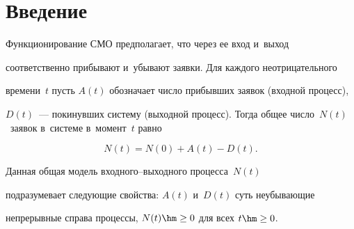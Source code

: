 

      












 \thispagestyle{headings}


 


 \vspace*{-12pt}





\section{Введение}





\vspace*{-4pt}














     Функционирование СМО предполагает, что через ее вход и~выход 


соответственно прибывают и~убывают заявки. Для каждого неотрицательного 


времени~$t$ пусть $A(t)$ обозначает чис\-ло прибывших заявок (входной процесс), 


$D(t)$~--- покинувших сис\-те\-му (выходной процесс). Тогда общее чис\-ло~$N(t)$~заявок в~сис\-те\-ме в~момент~$t$ равно


     $$


     N(t)=N(0)+A(t)-D(t).


     $$


Данная общая модель вход\-но\-го--вы\-ход\-но\-го процесса~$N(t)$ 


подразумевает сле\-ду\-ющие свойства: $A(t)$ и~$D(t)$ суть неубывающие 


непрерывные справа процессы, $N(t)\hm\geq 0$ для всех $t\hm\geq 0$. 


